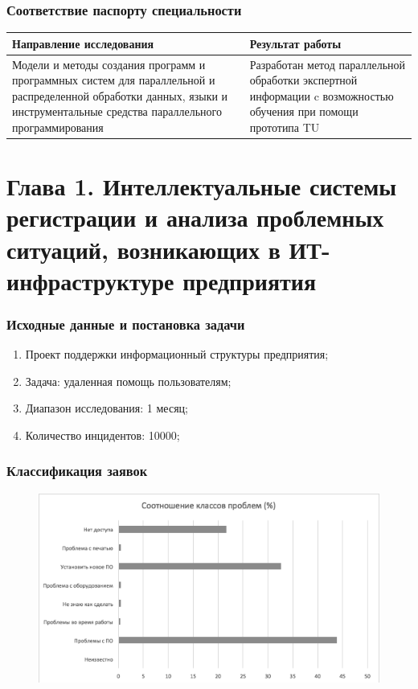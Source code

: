 \documentclass[14pt]{beamer}
\begin{document}
\begin{frame}
\frametitle{Соответствие паспорту специальности}

\begin{table}
	
\small

\begin{tabular} {|p{5cm}|p{5cm}|}


 \hline
\textbf{Направление исследования} & Результат работы\\

 \hline
   Модели и методы создания программ и программных систем для параллельной и распределенной обработки данных, языки и инструментальные средства параллельного программирования & Разработан метод параллельной обработки экспертной информации c возможностью обучения при помощи прототипа TU \\
   \hline
 \end{tabular}
\end{table}
\end{frame}

%
%
\section[Глава 1]{Глава 1. Интеллектуальные системы регистрации и анализа проблемных ситуаций, возникающих в ИТ-инфраструктуре предприятия}
\begin{frame}
\frametitle{Исходные данные и постановка задачи}
\begin{enumerate}
  \item Проект поддержки информационный структуры предприятия;
  \item Задача: удаленная помощь пользователям;
  \item Диапазон исследования: 1 месяц;
  \item Количество инцидентов: 10000;

\end{enumerate}
\end{frame}

\begin{frame}
\frametitle{Классификация заявок}
\begin{figure} [h] 
  \center
  \includegraphics [scale=0.7] {EngineerTasks}
  \label{img:EngineerTasks}  
\end{figure}


\end{frame}
\end{document}
